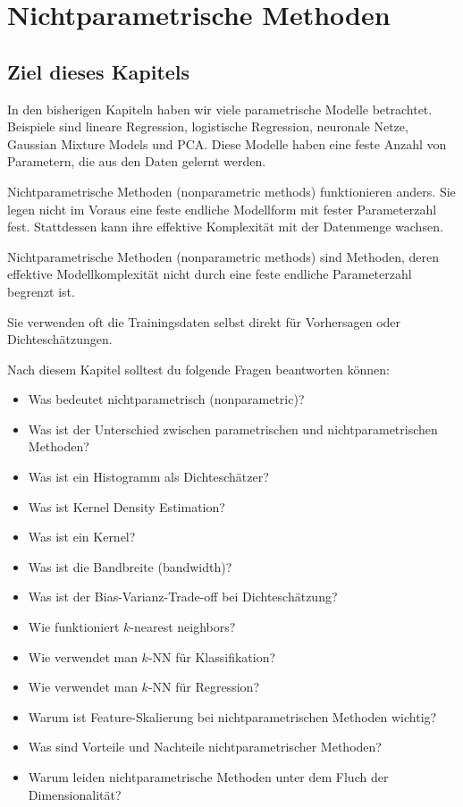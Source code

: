 \chapter{Nichtparametrische Methoden}

\section{Ziel dieses Kapitels}

In den bisherigen Kapiteln haben wir viele parametrische Modelle betrachtet.
Beispiele sind lineare Regression, logistische Regression, neuronale Netze, Gaussian Mixture Models und PCA.
Diese Modelle haben eine feste Anzahl von Parametern, die aus den Daten gelernt werden.

Nichtparametrische Methoden (nonparametric methods) funktionieren anders.
Sie legen nicht im Voraus eine feste endliche Modellform mit fester Parameterzahl fest.
Stattdessen kann ihre effektive Komplexität mit der Datenmenge wachsen.

\begin{conceptbox}
Nichtparametrische Methoden (nonparametric methods) sind Methoden, deren effektive Modellkomplexität nicht durch eine feste endliche Parameterzahl begrenzt ist.

Sie verwenden oft die Trainingsdaten selbst direkt für Vorhersagen oder Dichteschätzungen.
\end{conceptbox}

Nach diesem Kapitel solltest du folgende Fragen beantworten können:

\begin{itemize}
    \item Was bedeutet nichtparametrisch (nonparametric)?
    \item Was ist der Unterschied zwischen parametrischen und nichtparametrischen Methoden?
    \item Was ist ein Histogramm als Dichteschätzer?
    \item Was ist Kernel Density Estimation?
    \item Was ist ein Kernel?
    \item Was ist die Bandbreite (bandwidth)?
    \item Was ist der Bias-Varianz-Trade-off bei Dichteschätzung?
    \item Wie funktioniert \(k\)-nearest neighbors?
    \item Wie verwendet man \(k\)-NN für Klassifikation?
    \item Wie verwendet man \(k\)-NN für Regression?
    \item Warum ist Feature-Skalierung bei nichtparametrischen Methoden wichtig?
    \item Was sind Vorteile und Nachteile nichtparametrischer Methoden?
    \item Warum leiden nichtparametrische Methoden unter dem Fluch der Dimensionalität?
\end{itemize}

